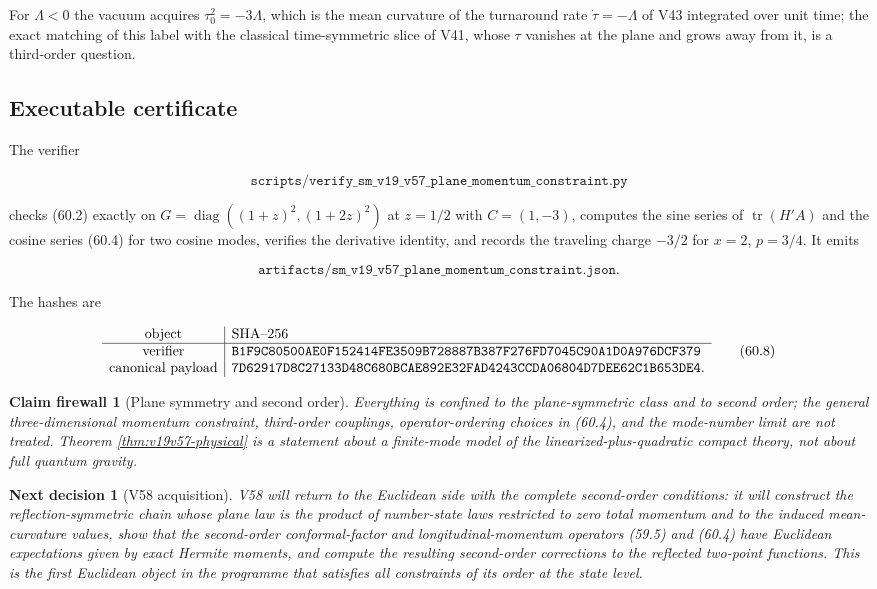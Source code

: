 \documentclass[11pt]{article}
\newtheorem{firewall}[theorem]{Claim firewall}
\newtheorem{decision}[theorem]{Next decision}
\theoremstyle{remark}
\begin{document}
For \(\Lambda<0\) the vacuum acquires \(\tau_0^2=-3\Lambda\), which is
the mean curvature of the turnaround rate \(\dot\tau=-\Lambda\) of V43
integrated over unit time; the exact matching of this label with the
classical time-symmetric slice of V41, whose \(\tau\) vanishes at the
plane and grows away from it, is a third-order question.

\subsection{Executable certificate}

The verifier

\[
 \texttt{scripts/verify\_sm\_v19\_v57\_plane\_momentum\_constraint.py}
                                                                    \tag{60.6}
\]

checks (60.2) exactly on \(G=\operatorname{diag}((1+z)^2,(1+2z)^2)\) at
\(z=1/2\) with \(C=(1,-3)\), computes the sine series of
\(\operatorname{tr}(H'A)\) and the cosine series (60.4) for two
cosine modes, verifies the derivative identity, and records the
traveling charge \(-3/2\) for \(x=2\), \(p=3/4\).  It emits

\[
 \texttt{artifacts/sm\_v19\_v57\_plane\_momentum\_constraint.json}.  \tag{60.7}
\]

The hashes are

\[
\begin{array}{c|l}
\hbox{object}&\hbox{SHA--256}\\ \hline
\hbox{verifier}&
\texttt{B1F9C80500AE0F152414FE3509B728887B387F276FD7045C90A1D0A976DCF379}\\
\hbox{canonical payload}&
\texttt{7D62917D8C27133D48C680BCAE892E32FAD4243CCDA06804D7DEE62C1B653DE4}.
\end{array}                                                     \tag{60.8}
\]

\begin{firewall}[Plane symmetry and second order]
\label{fire:v19v57}
Everything is confined to the plane-symmetric class and to second
order; the general three-dimensional momentum constraint, third-order
couplings, operator-ordering choices in (60.4), and the mode-number
limit are not treated.  Theorem \ref{thm:v19v57-physical} is a
statement about a finite-mode model of the linearized-plus-quadratic
compact theory, not about full quantum gravity.
\end{firewall}

\begin{decision}[V58 acquisition]
\label{dec:v19v57-next}
V58 will return to the Euclidean side with the complete second-order
conditions: it will construct the reflection-symmetric chain whose
plane law is the product of number-state laws restricted to zero total
momentum and to the induced mean-curvature values, show that the
second-order conformal-factor and longitudinal-momentum operators
(59.5) and (60.4) have Euclidean expectations given by exact
Hermite moments, and compute the resulting second-order corrections to
the reflected two-point functions.  This is the first Euclidean object
in the programme that satisfies all constraints of its order at the
state level.
\end{decision}
\end{document}
